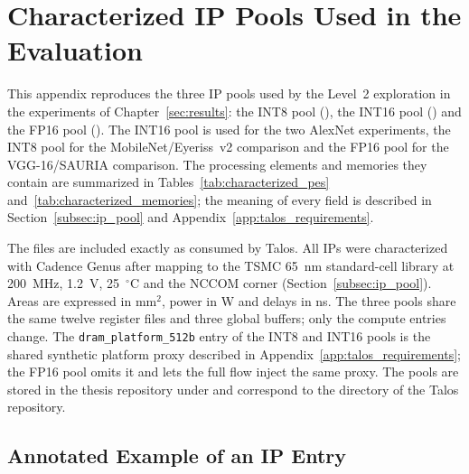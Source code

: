 \newpage
\section{Characterized IP Pools Used in the Evaluation}
\label{app:ip_pools}

This appendix reproduces the three IP pools used by the Level~2
exploration in the experiments of Chapter~\ref{sec:results}: the INT8
pool (), the INT16 pool
() and the FP16 pool
(). The INT16 pool is used for the two
AlexNet experiments, the INT8 pool for the MobileNet/Eyeriss~v2
comparison and the FP16 pool for the VGG-16/SAURIA comparison. The
processing elements and memories they contain are summarized in
Tables~\ref{tab:characterized_pes}
and~\ref{tab:characterized_memories}; the meaning of every field is
described in Section~\ref{subsec:ip_pool} and
Appendix~\ref{app:talos_requirements}.

The files are included exactly as consumed by Talos. All IPs were
characterized with Cadence Genus after mapping to the TSMC 65~nm
standard-cell library at 200~MHz, 1.2~V, 25~$^\circ$C and the NCCOM
corner (Section~\ref{subsec:ip_pool}). Areas are expressed in mm$^2$,
power in W and delays in ns. The three pools share the same twelve
register files and three global buffers; only the compute entries
change. The \texttt{dram\_platform\_512b} entry of the INT8 and INT16
pools is the shared synthetic platform proxy described in
Appendix~\ref{app:talos_requirements}; the FP16 pool omits it and lets
the full flow inject the same proxy. The pools are stored in the
thesis repository under  and correspond to the
 directory of the Talos repository.


\subsection{Annotated Example of an IP Entry}
\label{app:ip_pool_example}

